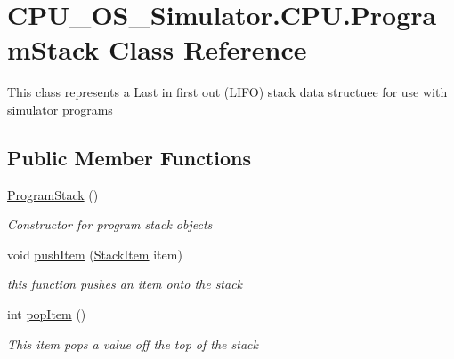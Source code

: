 \hypertarget{class_c_p_u___o_s___simulator_1_1_c_p_u_1_1_program_stack}{}\section{C\+P\+U\+\_\+\+O\+S\+\_\+\+Simulator.\+C\+P\+U.\+Program\+Stack Class Reference}
\label{class_c_p_u___o_s___simulator_1_1_c_p_u_1_1_program_stack}


This class represents a Last in first out (L\+I\+F\+O) stack data structuee for use with simulator programs  


\subsection*{Public Member Functions}
\begin{DoxyCompactItemize}
\item 
\hyperlink{class_c_p_u___o_s___simulator_1_1_c_p_u_1_1_program_stack_a2a30dfbb7df3408de94c883c44aff090}{Program\+Stack} ()
\begin{DoxyCompactList}\small\item\em Constructor for program stack objects \end{DoxyCompactList}\item 
void \hyperlink{class_c_p_u___o_s___simulator_1_1_c_p_u_1_1_program_stack_ae52c8a15274b2e86e02572ba13cad60c}{push\+Item} (\hyperlink{class_c_p_u___o_s___simulator_1_1_c_p_u_1_1_stack_item}{Stack\+Item} item)
\begin{DoxyCompactList}\small\item\em this function pushes an item onto the stack \end{DoxyCompactList}\item 
int \hyperlink{class_c_p_u___o_s___simulator_1_1_c_p_u_1_1_program_stack_a32a272fedcd1d8ac5673b3ef90689519}{pop\+Item} ()
\begin{DoxyCompactList}\small\item\em This item pops a value off the top of the stack \end{DoxyCompactList}\end{DoxyCompactItemize}
